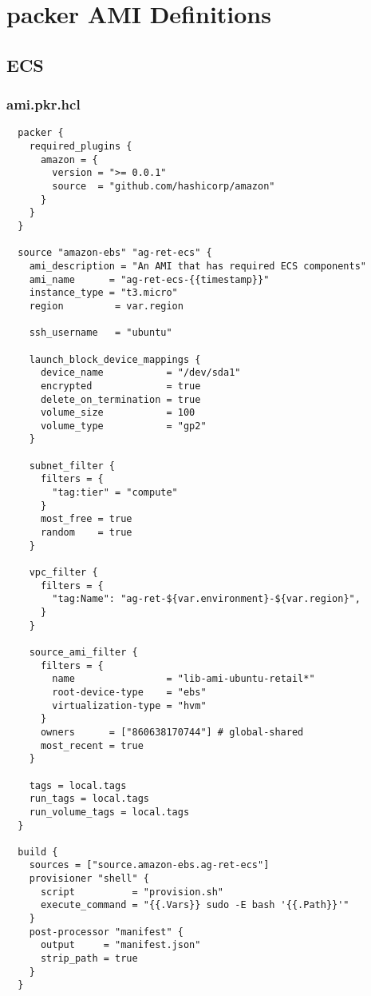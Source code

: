 \chapter{packer AMI Definitions}
\label{appendix:packer_ami_defintions}

\section{ECS}
\subsection*{ami.pkr.hcl}
\begin{verbatim}
  packer {
    required_plugins {
      amazon = {
        version = ">= 0.0.1"
        source  = "github.com/hashicorp/amazon"
      }
    }
  }
  
  source "amazon-ebs" "ag-ret-ecs" {
    ami_description = "An AMI that has required ECS components"
    ami_name      = "ag-ret-ecs-{{timestamp}}"
    instance_type = "t3.micro"
    region         = var.region
  
    ssh_username   = "ubuntu"
  
    launch_block_device_mappings {
      device_name           = "/dev/sda1"
      encrypted             = true
      delete_on_termination = true
      volume_size           = 100
      volume_type           = "gp2"
    }
    
    subnet_filter {
      filters = {
        "tag:tier" = "compute"
      }
      most_free = true
      random    = true
    }
    
    vpc_filter {
      filters = {
        "tag:Name": "ag-ret-${var.environment}-${var.region}",
      }
    }
  
    source_ami_filter {
      filters = {
        name                = "lib-ami-ubuntu-retail*"
        root-device-type    = "ebs"
        virtualization-type = "hvm"
      }
      owners      = ["860638170744"] # global-shared
      most_recent = true
    }
    
    tags = local.tags
    run_tags = local.tags
    run_volume_tags = local.tags
  }
  
  build {
    sources = ["source.amazon-ebs.ag-ret-ecs"]
    provisioner "shell" {
      script          = "provision.sh"
      execute_command = "{{.Vars}} sudo -E bash '{{.Path}}'"
    }
    post-processor "manifest" {
      output     = "manifest.json"
      strip_path = true
    }
  }  
\end{verbatim}


